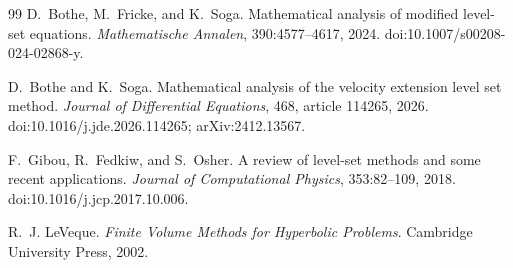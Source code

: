\documentclass[11pt,a4paper]{article}
\theoremstyle{definition}
\theoremstyle{remark}
\begin{document}
\begin{thebibliography}{99}
D.~Bothe, M.~Fricke, and K.~Soga.
\newblock Mathematical analysis of modified level-set equations.
\newblock \emph{Mathematische Annalen}, 390:4577--4617, 2024.
\newblock doi:10.1007/s00208-024-02868-y.

D.~Bothe and K.~Soga.
\newblock Mathematical analysis of the velocity extension level set method.
\newblock \emph{Journal of Differential Equations}, 468, article 114265, 2026.
\newblock doi:10.1016/j.jde.2026.114265; arXiv:2412.13567.

F.~Gibou, R.~Fedkiw, and S.~Osher.
\newblock A review of level-set methods and some recent applications.
\newblock \emph{Journal of Computational Physics}, 353:82--109, 2018.
\newblock doi:10.1016/j.jcp.2017.10.006.

R.~J. LeVeque.
\newblock \emph{Finite Volume Methods for Hyperbolic Problems}.
\newblock Cambridge University Press, 2002.

\end{thebibliography}
\end{document}
